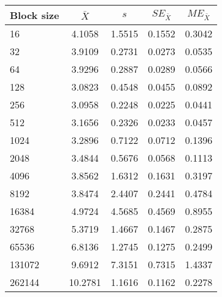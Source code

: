 \begin{tabular}{lcccc}\toprule
{\small Block size} & $\bar{X}$ & $s$ & $SE_{\bar{X}}$ & $ME_{\bar{X}}$ \\\midrule
16 & 4.1058 & 1.5515 & 0.1552 & 0.3042\\
32 & 3.9109 & 0.2731 & 0.0273 & 0.0535\\
64 & 3.9296 & 0.2887 & 0.0289 & 0.0566\\
128 & 3.0823 & 0.4548 & 0.0455 & 0.0892\\
256 & 3.0958 & 0.2248 & 0.0225 & 0.0441\\
512 & 3.1656 & 0.2326 & 0.0233 & 0.0457\\
1024 & 3.2896 & 0.7122 & 0.0712 & 0.1396\\
2048 & 3.4844 & 0.5676 & 0.0568 & 0.1113\\
4096 & 3.8562 & 1.6312 & 0.1631 & 0.3197\\
8192 & 3.8474 & 2.4407 & 0.2441 & 0.4784\\
16384 & 4.9724 & 4.5685 & 0.4569 & 0.8955\\
32768 & 5.3719 & 1.4667 & 0.1467 & 0.2875\\
65536 & 6.8136 & 1.2745 & 0.1275 & 0.2499\\
131072 & 9.6912 & 7.3151 & 0.7315 & 1.4337\\
262144 & 10.2781 & 1.1616 & 0.1162 & 0.2278\\
\bottomrule
\end{tabular}
